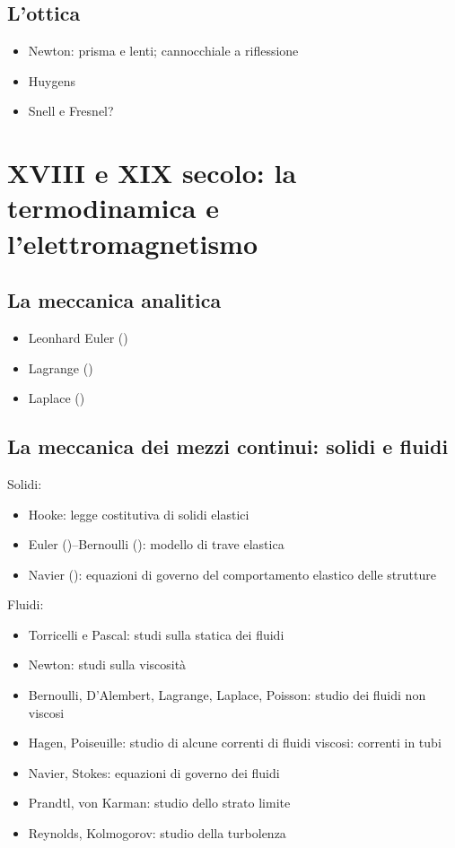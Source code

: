 \subsection{L'ottica}
\begin{itemize}
  \item Newton: prisma e lenti; cannocchiale a riflessione
  \item Huygens
  \item Snell e Fresnel?
\end{itemize}

\section{XVIII e XIX secolo: la termodinamica e l'elettromagnetismo}
\subsection{La meccanica analitica}
\begin{itemize}
  \item Leonhard Euler ()
  \item Lagrange ()
  \item Laplace ()
\end{itemize}
\subsection{La meccanica dei mezzi continui: solidi e fluidi}
Solidi:
\begin{itemize}
  \item Hooke: legge costitutiva di solidi elastici
  \item Euler ()--Bernoulli (): modello di trave elastica
  \item Navier (): equazioni di governo del comportamento elastico delle strutture
\end{itemize}
Fluidi:
\begin{itemize}
  \item Torricelli e Pascal: studi sulla statica dei fluidi
  \item Newton: studi sulla viscosità
  \item Bernoulli, D'Alembert, Lagrange, Laplace, Poisson: studio dei fluidi non viscosi
  \item Hagen, Poiseuille: studio di alcune correnti di fluidi viscosi: correnti in tubi
  \item Navier, Stokes: equazioni di governo dei fluidi
  \item Prandtl, von Karman: studio dello strato limite
  \item Reynolds, Kolmogorov: studio della turbolenza
\end{itemize}
